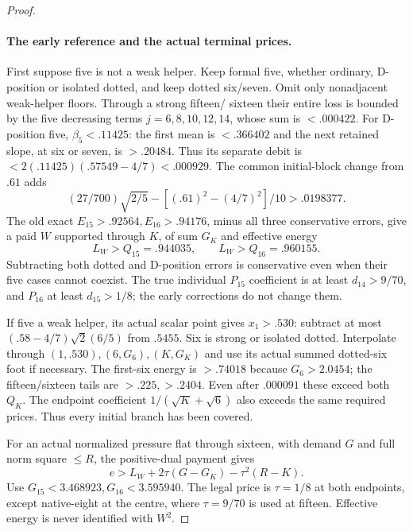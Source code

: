 \begin{proof}
\paragraph{The early reference and the actual terminal prices.}
First suppose five is not a weak helper. Keep formal five, whether
ordinary, D-position or isolated dotted, and keep dotted six/seven.
Omit only nonadjacent weak-helper floors. Through a strong fifteen/
sixteen their entire loss is bounded by the five decreasing terms
$j=6,8,10,12,14$, whose sum is $<.000422$.
For D-position five, $\beta_5<.11425$: the first mean is
$<.366402$ and the next retained slope, at six or seven, is
$>.20484$. Thus its separate debit is
$<2(.11425)(.57549-4/7)<.000929$.
The common initial-block change from $.61$ adds
\[
 (27/700)\sqrt{2/5}-[(.61)^2-(4/7)^2]/10>.0198377.
\]
The old exact $E_{15}>.92564,E_{16}>.94176$, minus all three
conservative errors, give a paid $W$ supported through $K$, of
sum $G_K$ and effective energy
\[
 L_W>Q_{15}=.944035,\qquad L_W>Q_{16}=.960155.
\]
Subtracting both dotted and D-position errors is conservative even
when their five cases cannot coexist. The true individual $P_{15}$
coefficient is at least $d_{14}>9/70$, and $P_{16}$ at least
$d_{15}>1/8$; the early corrections do not change them.

If five a weak helper, its actual scalar point gives $x_1>.530$:
subtract at most $(.58-4/7)\sqrt2(6/5)$ from $.5455$.
Six is strong or isolated dotted. Interpolate through
$(1,.530),(6,G_6),(K,G_K)$ and use its actual summed dotted-six
foot if necessary. The first-six energy is $>.74018$ because
$G_6>2.0454$; the fifteen/sixteen tails are $>.225,>.2404$.
Even after $.000091$ these exceed both $Q_K$.
The endpoint coefficient $1/(\sqrt K+\sqrt6)$ also exceeds the
same required prices. Thus every initial branch has been covered.

For an actual normalized pressure flat through sixteen, with demand
$G$ and full norm square $\le R$, the positive-dual payment gives
\[
 e>L_W+2\tau(G-G_K)-\tau^2(R-K).
\]
Use $G_{15}<3.468923,G_{16}<3.595940$.
The legal price is $\tau=1/8$ at both endpoints, except native-eight
at the centre, where $\tau=9/70$ is used at fifteen.
Effective energy is never identified with $W^2$.


\end{proof}
